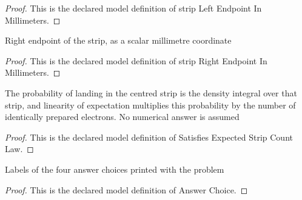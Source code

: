 \begin{proof}
  This is the declared model definition of strip Left Endpoint In Millimeters.
\end{proof}
\begin{definition}
  \label{def:physics:phyx-mini-0645:phyxminiproblems-problemphyxmini0645-striprightendpointinmillimeters}
  Right endpoint of the strip, as a scalar millimetre coordinate
\end{definition}
\begin{proof}
  This is the declared model definition of strip Right Endpoint In Millimeters.
\end{proof}
\begin{definition}
  \label{def:physics:phyx-mini-0645:phyxminiproblems-problemphyxmini0645-satisfiesexpectedstripcountlaw}
  The probability of landing in the centred strip is the density integral over that strip, and linearity of expectation multiplies this probability by the number of identically prepared electrons. No numerical answer is assumed
\end{definition}
\begin{proof}
  This is the declared model definition of Satisfies Expected Strip Count Law.
\end{proof}
\begin{definition}
  \label{def:physics:phyx-mini-0645:phyxminiproblems-problemphyxmini0645-answerchoice}
  Labels of the four answer choices printed with the problem
\end{definition}
\begin{proof}
  This is the declared model definition of Answer Choice.
\end{proof}
